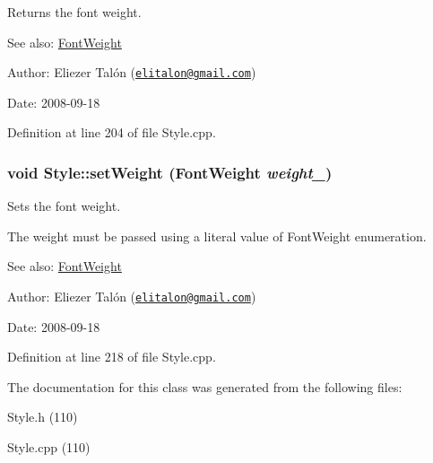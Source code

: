 Returns the font weight. 

\begin{Desc}
\item[See also:]\hyperlink{_font_weight_8h_ecff23ba4a68486421bcea57e095fe66}{FontWeight}\end{Desc}
\begin{Desc}
\item[Author:]Eliezer Talón (\href{mailto:elitalon@gmail.com}{\tt elitalon@gmail.com}) \end{Desc}
\begin{Desc}
\item[Date:]2008-09-18 \end{Desc}


Definition at line 204 of file Style.cpp.\hypertarget{class_style_75f1eaa59c2aff7c52df467c0d9157b1}{
\subsubsection[setWeight]{\setlength{\rightskip}{0pt plus 5cm}void Style::setWeight ({\bf FontWeight} {\em weight\_\-})}}
\label{class_style_75f1eaa59c2aff7c52df467c0d9157b1}


Sets the font weight. 

The weight must be passed using a literal value of FontWeight enumeration.

\begin{Desc}
\item[See also:]\hyperlink{_font_weight_8h_ecff23ba4a68486421bcea57e095fe66}{FontWeight}\end{Desc}
\begin{Desc}
\item[Author:]Eliezer Talón (\href{mailto:elitalon@gmail.com}{\tt elitalon@gmail.com}) \end{Desc}
\begin{Desc}
\item[Date:]2008-09-18 \end{Desc}


Definition at line 218 of file Style.cpp.

The documentation for this class was generated from the following files:\begin{CompactItemize}
\item 
Style.h (110)\item 
Style.cpp (110)\end{CompactItemize}
